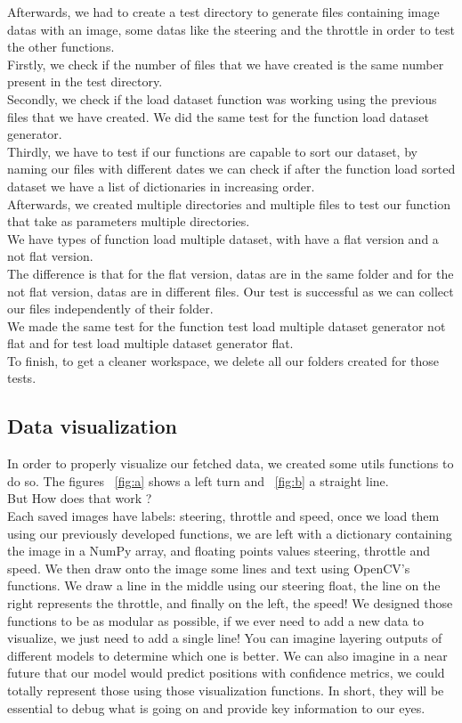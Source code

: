\documentclass[12pt]{article}
\begin{document}
Afterwards, we had to create a test directory to generate files containing image datas with an image, some datas like the steering and the throttle in order to test the other functions. \\ 
Firstly, we check if the number of files that we have created is the same number present in the test directory. \\ 
Secondly, we check if the load dataset function was working using the previous files that we have created. We did the same test for the function load dataset generator. \\ 
Thirdly, we have to test if our functions are capable to sort our dataset, by naming our files with different dates we can check if after the function load sorted dataset we have a list of dictionaries in increasing order. \\ 
Afterwards, we created multiple directories and multiple files to test our function that take as parameters multiple directories. \\ 
We have types of function load multiple dataset, with have a flat version and a not flat version. \\ 
The difference is that for the flat version, datas are in the same folder and for the not flat version, datas are in different files. Our test is successful as we can collect our files independently of their folder. \\ 
We made the same test for the function test load multiple dataset generator not flat and for test load multiple dataset generator flat. \\ 
To finish, to get a cleaner workspace, we delete all our folders created for those tests. \\ 

\subsection{Data visualization}
In order to properly visualize our fetched data, we created some utils functions to do so.
The figures ~\ref{fig:a} shows a left turn and ~\ref{fig:b} a straight line. \\ But How does that work ? \\ Each saved images have labels: steering, throttle and speed, once we load them using our previously developed functions, we are left with a dictionary containing the image in a NumPy array, and floating points values steering, throttle and speed. We then draw onto the image some lines and text using OpenCV's functions. We draw a line in the middle using our steering float, the line on the right represents the throttle, and finally on the left, the speed! We designed those functions to be as modular as possible, if we ever need to add a new data to visualize, we just need to add a single line! You can imagine layering outputs of different models to determine which one is better. We can also imagine in a near future that our model would predict positions with confidence metrics, we could totally represent those using those visualization functions. In short, they will be essential to debug what is going on and provide key information to our eyes.
\end{document}
